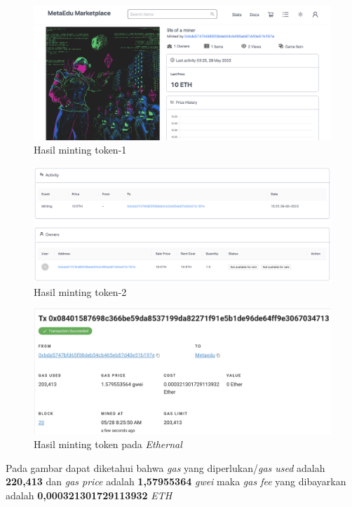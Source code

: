 \begin{itemize}
      \begin{figure} [H] \centering
          \includegraphics[scale=0.3]{gambar/img-test-share-mint-2.png}
          \caption{Hasil minting token-1}
          \label{fig:TestShareHasilMinting}
        \end{figure}
        \begin{figure} [H] \centering
          \includegraphics[scale=0.3]{gambar/img-test-share-mint-3.png}
          \caption{Hasil minting token-2}
          \label{fig:TestShareHasilMinting2}
        \end{figure}
        \begin{figure} [H] \centering
          \includegraphics[scale=0.4]{gambar/img-test-share-mint-4.png}
          \caption{Hasil minting token pada \emph{Ethernal}}
          \label{fig:TestShareHasilMinting3}
        \end{figure}
      Pada gambar dapat diketahui bahwa \emph{gas} yang diperlukan/\emph{gas used} adalah \textbf{220,413} dan \emph{gas price} adalah \textbf{1,57955364} \emph{gwei} maka \emph{gas fee} yang dibayarkan adalah \textbf{0,000321301729113932} \emph{ETH}

\end{itemize}
